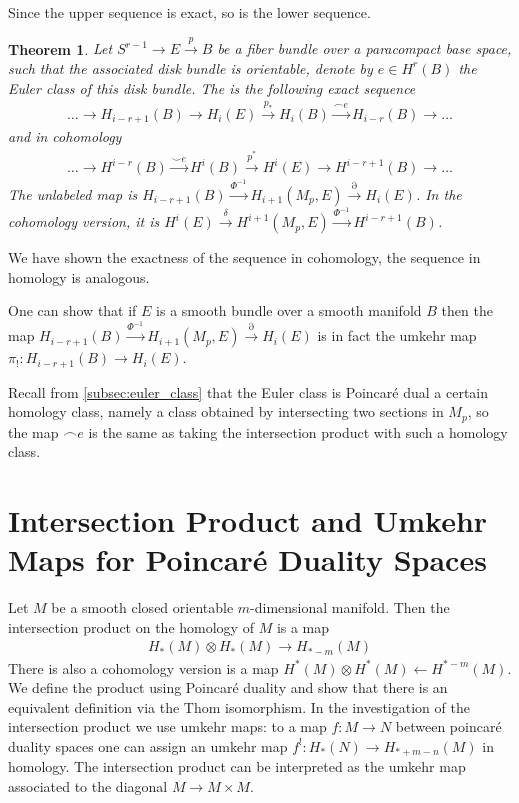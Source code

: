 \documentclass{scrartcl}
\let\emph\relax
\theoremstyle{plain}
\newtheorem{theorem}{Theorem}[section]
\theoremstyle{definition}
\newcommand{\capp}{\mathbin{\frown}}
\newcommand{\cupp}{\mathbin{\smile}}
\newcommand{\from}{\leftarrow}
\begin{document}
Since the upper sequence is exact, so is the lower sequence.

\begin{theorem}
    Let $S^{r-1} \to E \xrightarrow{p} B$ be a fiber bundle over a paracompact base space, such that the associated disk bundle is orientable, denote by $e\in H^r(B)$ the Euler class of this disk bundle. The \emph{Gysin sequence} is the following exact sequence
    \begin{align*}
        \dots \to H_{i-r+1}(B) \to H_i(E) \xrightarrow{p_*} H_i(B) \xrightarrow{\capp e} H_{i-r}(B) \to \dots
    \end{align*}
    and in cohomology
    \begin{align*}
        \dots \to H^{i-r}(B) \xrightarrow{\cupp e} H^i(B) \xrightarrow{p^*} H^i(E) \to H^{i-r+1}(B)\to \dots
    \end{align*}
    The unlabeled map is $H_{i-r+1}(B) \xrightarrow{\Phi^{-1}} H_{i+1}(M_p, E) \xrightarrow{\partial} H_i(E)$. In the cohomology version, it is $H^i(E) \xrightarrow{\delta} H^{i+1}(M_p, E) \xrightarrow{\Phi^{-1}} H^{i-r+1}(B)$. 
\end{theorem}

We have shown the exactness of the sequence in cohomology, the sequence in homology is analogous. 

One can show that if $E$ is a smooth bundle over a smooth manifold $B$ then the map $H_{i-r+1}(B) \xrightarrow{\Phi^{-1}} H_{i+1}(M_p, E) \xrightarrow{\partial} H_i(E)$ is in fact the umkehr map $\pi_!\colon H_{i-r+1}(B) \to H_i(E)$. 

Recall from \ref{subsec:euler_class} that the Euler class is Poincaré dual a certain homology class, namely a class obtained by intersecting two sections in $M_p$, so the map $\capp e$ is the same as taking the intersection product with such a homology class. 

\section{Intersection Product and Umkehr Maps for Poincaré Duality Spaces}\label{sec:intersection_product}

Let $M$ be a smooth closed orientable $m$-dimensional manifold. Then the intersection product on the homology of $M$ is a map
\begin{align*}
    H_*(M) \otimes H_*(M) \to H_{*-m}(M)
\end{align*}
There is also a cohomology version is a map $H^*(M) \otimes H^*(M) \from H^{*-m}(M)$. We define the product using Poincaré duality and show that there is an equivalent definition via the Thom isomorphism. In the investigation of the intersection product we use umkehr maps: to a map $f\colon M\to N$ between poincaré duality spaces one can assign an umkehr map $f^!\colon H_*(N)\to H_{*+m-n}(M)$ in homology. The intersection product can be interpreted as the umkehr map associated to the diagonal $M\to M\times M$. 
\end{document}
